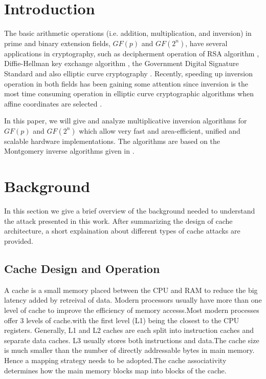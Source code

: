\documentclass[twocolumn]{IEEEtran}
\begin{document}
\section {Introduction}

The basic arithmetic operations (i.e. addition, multiplication, and 
inversion) in prime and binary extension fields, $GF(p)$ and $GF(2^n)$, 
have several applications in cryptography, such as decipherment 
operation of RSA algorithm \cite{QC82:Fast}, Diffie-Hellman key exchange 
algorithm \cite{DH76:New}, the Government Digital Signature Standard 
\cite{NIST91:DSS} and also elliptic curve cryptography 
\cite{K87:Elliptic,M93:Elliptic}. Recently, speeding up inversion operation
in both fields has been gaining some attention since inversion is the
most time consuming operation in elliptic curve cryptographic algorithms 
when affine coordinates are selected \cite{K95:The,SOOS95:Fast,%
K99:Fast,SK00:The,H01:Efficient}.

In this paper, we will give and analyze multiplicative inversion algorithms
for $GF(p)$ and $GF(2^n)$ which allow very fast and area-efficient, unified
and scalable hardware
implementations. The algorithms are based on the Montgomery inverse algorithms 
given in \cite{K95:The}. 

\section {Background}

In this section we give a brief overview of the background needed to understand the attack presented in this work. After summarizing the design of cache architecture, a short explaination about different types of cache attacks are provided.

\subsection {Cache Design and Operation}

A cache is a small memory placed between the CPU and RAM to reduce the big latency added by retreival of data. Modern processors usually have more than one level of cache to improve the efficiency of memory accesss.Most modern processes offer 3 levels of cache.with the first level (L1) being the closest to the CPU registers. Generally, L1 and L2 caches are each split into instruction caches and separate data caches. L3 usually stores both instructions and data.The cache size is much smaller than the number of directly addressable bytes in main memory. Hence a mapping strategy needs to be adopted.The cache associativity determines how the main memory blocks map into blocks of the cache.
\end{document}
